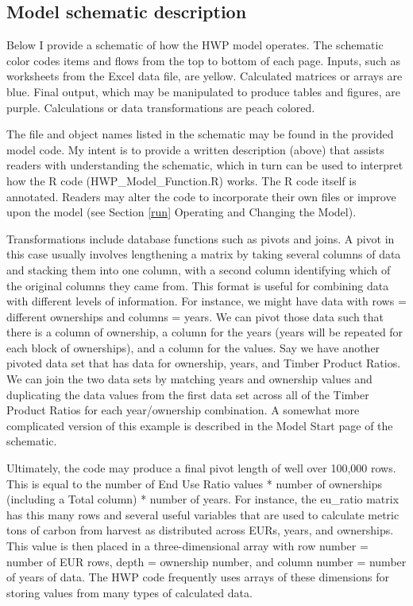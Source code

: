 \documentclass[
]{book}
\begin{document}
\hypertarget{model-func-schdesc}{%
\subsection{Model schematic description}\label{model-func-schdesc}}

Below I provide a schematic of how the HWP model operates. The schematic color codes items and flows from the top to bottom of each page. Inputs, such as worksheets from the Excel data file, are yellow. Calculated matrices or arrays are blue. Final output, which may be manipulated to produce tables and figures, are purple. Calculations or data transformations are peach colored.

The file and object names listed in the schematic may be found in the provided model code. My intent is to provide a written description (above) that assists readers with understanding the schematic, which in turn can be used to interpret how the R code (HWP\_Model\_Function.R) works. The R code itself is annotated. Readers may alter the code to incorporate their own files or improve upon the model (see Section \ref{run} Operating and Changing the Model).

Transformations include database functions such as pivots and joins. A pivot in this case usually involves lengthening a matrix by taking several columns of data and stacking them into one column, with a second column identifying which of the original columns they came from. This format is useful for combining data with different levels of information. For instance, we might have data with rows = different ownerships and columns = years. We can pivot those data such that there is a column of ownership, a column for the years (years will be repeated for each block of ownerships), and a column for the values. Say we have another pivoted data set that has data for ownership, years, and Timber Product Ratios. We can join the two data sets by matching years and ownership values and duplicating the data values from the first data set across all of the Timber Product Ratios for each year/ownership combination. A somewhat more complicated version of this example is described in the Model Start page of the schematic.

Ultimately, the code may produce a final pivot length of well over 100,000 rows. This is equal to the number of End Use Ratio values * number of ownerships (including a Total column) * number of years. For instance, the eu\_ratio matrix has this many rows and several useful variables that are used to calculate metric tons of carbon from harvest as distributed across EURs, years, and ownerships. This value is then placed in a three-dimensional array with row number = number of EUR rows, depth = ownership number, and column number = number of years of data. The HWP code frequently uses arrays of these dimensions for storing values from many types of calculated data.
\end{document}
